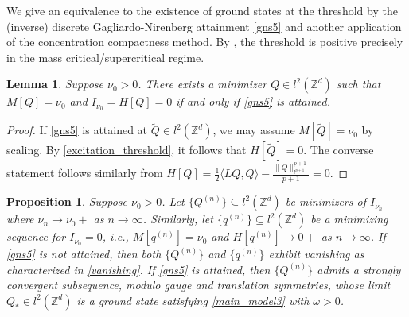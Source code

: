 \documentclass{article}
\numberwithin{equation}{section}
\newtheorem{lemma}{Lemma}[section]
\newtheorem{proposition}{Proposition}[section]
\begin{document}
We give an equivalence to the existence of ground states at the threshold by the (inverse) discrete Gagliardo-Nirenberg attainment \eqref{gns5} and another application of the concentration compactness method. By , the threshold is positive precisely in the mass critical/supercritical regime.

\begin{lemma}\label{gn_equiv}
    Suppose $\nu_0 > 0$. There exists a minimizer $Q \in l^2(\mathbb{Z}^d)$ such that $M[Q] = \nu_0$ and $I_{\nu_0} = H[Q] = 0$ if and only if \eqref{gns5} is attained.
\end{lemma}

\begin{proof}
If \eqref{gns5} is attained at $\tilde{Q} \in l^2(\mathbb{Z}^d)$, we may assume $M[\tilde{Q}] = \nu_0$ by scaling. By \eqref{excitation_threshold}, it follows that $H[\tilde{Q}] = 0$. The converse statement follows similarly from $H[Q] = \frac{1}{2} \langle LQ,Q \rangle - \frac{\| Q \|_{l^{p+1}}^{p+1}}{p+1} = 0$.    
\end{proof}

\begin{proposition}
    Suppose $\nu_0 > 0$. Let $\{Q^{(n)}\} \subseteq l^2(\mathbb{Z}^d)$ be minimizers of $I_{\nu_n}$ where $\nu_n \rightarrow \nu_0 +$ as $n \rightarrow \infty$. Similarly, let $\{q^{(n)}\} \subseteq l^2(\mathbb{Z}^d)$ be a minimizing sequence for $I_{\nu_0} = 0$, i.e., $M[q^{(n)}] = \nu_0$ and $H[q^{(n)}] \rightarrow 0+$ as $n \rightarrow \infty$. If \eqref{gns5} is not attained, then both $\{Q^{(n)}\}$ and $\{q^{(n)}\}$ exhibit vanishing as characterized in \eqref{vanishing}. If \eqref{gns5} is attained, then $\{Q^{(n)}\}$ admits a strongly convergent subsequence, modulo gauge and translation symmetries, whose limit $Q_{*} \in l^2(\mathbb{Z}^d)$ is a ground state satisfying \eqref{main_model3} with $\omega > 0$. 
\end{proposition}
\end{document}
